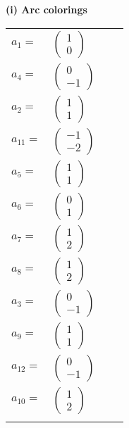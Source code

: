\documentclass[1p]{elsarticle_modified}
\theoremstyle{definition}
\begin{document}
\flushleft \textbf{(i) Arc colorings}\\
\begin{tabular}{m{7pt} m{180pt} m{7pt} m{180pt} }
\flushright $a_{1}=$&$\begin{pmatrix}1\\0\end{pmatrix}$ \\
\flushright $a_{4}=$&$\begin{pmatrix}0\\-1\end{pmatrix}$ \\
\flushright $a_{2}=$&$\begin{pmatrix}1\\1\end{pmatrix}$ \\
\flushright $a_{11}=$&$\begin{pmatrix}-1\\-2\end{pmatrix}$ \\
\flushright $a_{5}=$&$\begin{pmatrix}1\\1\end{pmatrix}$ \\
\flushright $a_{6}=$&$\begin{pmatrix}0\\1\end{pmatrix}$ \\
\flushright $a_{7}=$&$\begin{pmatrix}1\\2\end{pmatrix}$ \\
\flushright $a_{8}=$&$\begin{pmatrix}1\\2\end{pmatrix}$ \\
\flushright $a_{3}=$&$\begin{pmatrix}0\\-1\end{pmatrix}$ \\
\flushright $a_{9}=$&$\begin{pmatrix}1\\1\end{pmatrix}$ \\
\flushright $a_{12}=$&$\begin{pmatrix}0\\-1\end{pmatrix}$ \\
\flushright $a_{10}=$&$\begin{pmatrix}1\\2\end{pmatrix}$\\&\end{tabular}
\end{document}
